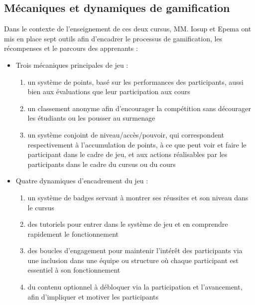\subsection{Mécaniques et dynamiques de gamification}
Dans le contexte de l'enseignement de ces deux cursus, MM. Iosup et Epema ont mis en place sept outils afin d'encadrer le processus de gamification, les récompenses et le parcours des apprenants :
\begin{itemize}
    \item Trois mécaniques principales de jeu :
    \begin{enumerate}
        \item un système de points, basé sur les performances des participants, aussi bien aux évaluations que leur participation aux cours
        \item un classement anonyme afin d’encourager la compétition sans décourager les étudiants ou les pousser au surmenage
        \item un système conjoint de niveau/accès/pouvoir, qui correspondent respectivement à l’accumulation de points, à ce que peut voir et faire le participant dans le cadre de jeu, et aux actions réalisables par les participants dans le cadre du cursus ou du cours
    \end{enumerate}
    \item Quatre dynamiques d'encadrement du jeu :
    \begin{enumerate}
        \item un système de badges servant à montrer ses réussites et son niveau dans le cursus
        \item des tutoriels pour entrer dans le système de jeu et en comprendre rapidement le fonctionnement
        \item des boucles d’engagement pour maintenir l’intérêt des participants via une inclusion dans une équipe ou structure où chaque participant est essentiel à son fonctionnement
        \item du contenu optionnel à débloquer via la participation et l’avancement, afin d’impliquer et motiver les participants
    \end{enumerate}
\end{itemize}

